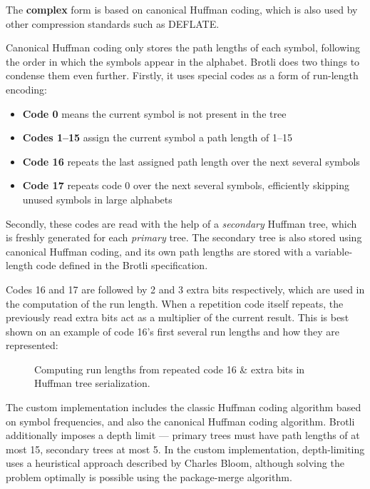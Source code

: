 \documentclass[english,master,dept460,male,cpp,cpdeclaration]{diploma}
\newcommand{\nosep}{\itemsep0em}
\newcommand{\texfigure}[1]{
}
\begin{document}
		\noindent
		The \textbf{complex} form is based on canonical Huffman coding\cite{RFC7932}, which is also used by other compression standards such as DEFLATE\cite{RFC1951}.
		
		Canonical Huffman coding only stores the path lengths of each symbol, following the order in which the symbols appear in the alphabet. Brotli does two things to condense them even further. Firstly, it uses special codes as a form of run-length encoding:
		
		\begin{itemize} \nosep
			\item \textbf{Code 0} means the current symbol is not present in the tree
			\item \textbf{Codes 1--15} assign the current symbol a path length of 1--15
			\item \textbf{Code 16} repeats the last assigned path length over the next several symbols
			\item \textbf{Code 17} repeats code 0 over the next several symbols, efficiently skipping unused symbols in large alphabets
		\end{itemize}
		
		\noindent
		Secondly, these codes are read with the help of a \emph{secondary} Huffman tree, which is freshly generated for each \emph{primary} tree. The secondary tree is also stored using canonical Huffman coding, and its own path lengths are stored with a variable-length code defined in the Brotli specification.
		
		Codes 16 and 17 are followed by 2 and 3 extra bits respectively, which are used in the computation of the run length. When a repetition code itself repeats, the previously read extra bits act as a multiplier of the current result. This is best shown on an example of code 16's first several run lengths and how they are represented:
		
		\begin{figure}[H]
			\centering
			\texfigure{huffman-tree-code-16-example}
			\caption{Computing run lengths from repeated code 16 \& extra bits in Huffman tree serialization.}
		\end{figure}
		
		\noindent
		The custom implementation includes the classic Huffman coding algorithm based on symbol frequencies, and also the canonical Huffman coding algorithm. Brotli additionally imposes a depth limit --- primary trees must have path lengths of at most 15, secondary trees at most 5. In the custom implementation, depth-limiting uses a heuristical approach described by Charles Bloom, although solving the problem optimally is possible using the package-merge algorithm\cite{DepthLimitedHuffmanTrees}.
		
\end{document}

